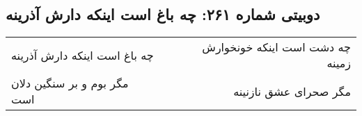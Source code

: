 \begin{center}
\section*{دوبیتی شماره ۲۶۱: چه باغ است اینکه دارش آذرینه}
\label{sec:261}
\begin{longtable}{l p{0.5cm} r}
چه باغ است اینکه دارش آذرینه
&&
چه دشت است اینکه خونخوارش زمینه
\\
مگر بوم و بر سنگین دلان است
&&
مگر صحرای عشق نازنینه
\\
\end{longtable}
\end{center}
